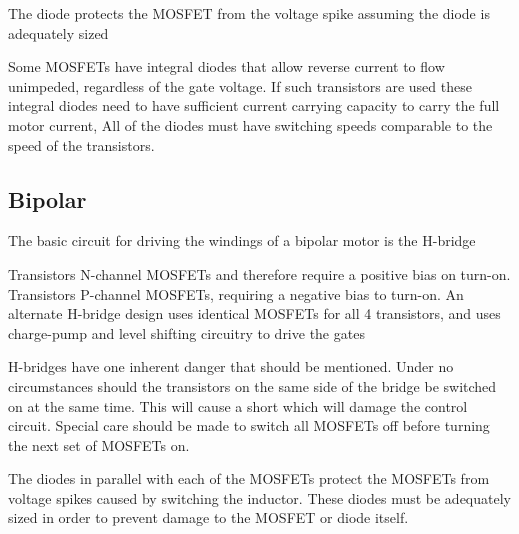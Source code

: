 \documentclass{report}
\begin{document}
The diode protects the MOSFET from the voltage spike assuming the diode is adequately sized

Some MOSFETs have integral diodes that allow reverse current to flow unimpeded, regardless of the
gate voltage. If such transistors are used these integral diodes need to have sufficient current carrying capacity
to carry the full motor current,  All of the diodes must have switching speeds comparable to the speed of the transistors.

\subsection*{Bipolar}
The basic circuit for driving the windings of a bipolar motor is the H-bridge

Transistors N-channel MOSFETs and therefore require a positive bias on turn-on. Transistors P-channel
MOSFETs, requiring a negative bias to turn-on. An alternate H-bridge design uses identical MOSFETs for all 4 
transistors, and uses charge-pump and level shifting circuitry to drive the gates

H-bridges have one inherent danger that should be mentioned. Under no circumstances should the
transistors on the same side of the bridge be switched on at the same time. This will cause a short which will
damage the control circuit. Special care should be made to switch all MOSFETs off before turning the next set of MOSFETs on.

The diodes in parallel with each of the MOSFETs protect the MOSFETs from voltage spikes caused by
switching the inductor. These diodes must be adequately sized in order to prevent damage to the
MOSFET or diode itself.
\end{document}
